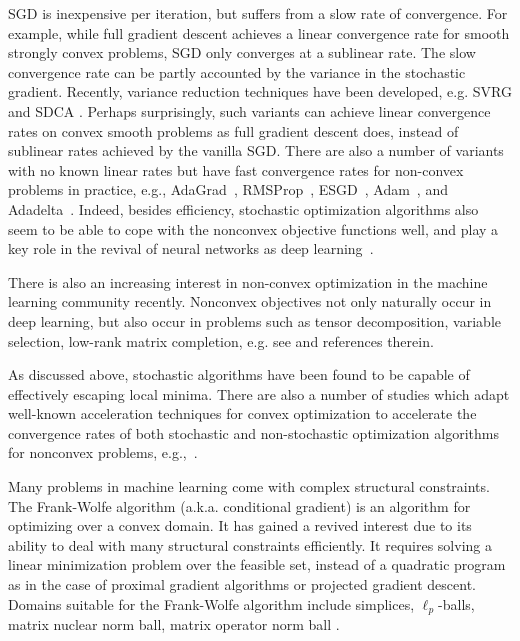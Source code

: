 SGD is inexpensive per iteration, but suffers from a slow rate of convergence.
For example, while full gradient descent achieves a linear convergence rate for
smooth strongly convex problems, SGD only converges at a sublinear rate.
The slow convergence rate can be partly accounted by the variance in the
stochastic gradient.
Recently, variance reduction techniques have been developed, e.g.
SVRG \cite{johnson2013accelerating} and SDCA \cite{shalev2013stochastic}.
Perhaps surprisingly, such variants can achieve linear convergence rates on
convex smooth problems as full gradient descent does, instead of sublinear rates
achieved by the vanilla SGD.
There are also a number of variants with no known linear rates but have fast
convergence rates for non-convex problems in practice, e.g.,
AdaGrad~\cite{duchi2011adaptive}, RMSProp~\cite{tijmen2012rmsprop},
ESGD~\cite{dauphin2015equilibrated}, Adam~\cite{kingma2014adam}, and
Adadelta~\cite{zeiler2012adadelta}.
Indeed, besides efficiency, stochastic optimization algorithms also seem to be able to
cope with the nonconvex objective functions well, and play a key role in the
revival of neural networks as deep learning~\cite{jin2017escape,ge2015escaping, levy2016power}.

\medskip{}
There is also an increasing interest in non-convex optimization in the machine
learning community recently.
Nonconvex objectives not only naturally occur in deep learning, but also occur
in problems such as tensor decomposition, variable selection, low-rank matrix
completion, e.g. see \cite{ge2015escaping,mazumder2011sparsenet,jain2013low}
and references therein.

As discussed above, stochastic algorithms have been found to be capable of
effectively escaping local minima.
There are also a number of studies which adapt well-known acceleration
techniques for convex optimization to accelerate the convergence rates of both
stochastic and non-stochastic optimization algorithms for nonconvex problems,
e.g.,~\cite{li2015accelerated,allen2016variance,reddi2016stochastic,sutskever2013importance}.

\medskip{}
Many problems in machine learning come with complex structural constraints.
The Frank-Wolfe algorithm (a.k.a. conditional gradient)
\cite{frank1956algorithm} is an algorithm for optimizing over a convex domain.
It has gained a revived interest due to its ability to deal with many structural
constraints efficiently.
It requires solving a linear minimization problem over the feasible set, instead
of a quadratic program as in the case of proximal gradient algorithms or
projected gradient descent.
Domains suitable for the Frank-Wolfe algorithm include simplices,
$\ell_p$-balls, matrix nuclear norm ball, matrix operator norm ball
\cite{jaggi2013revisiting}.

